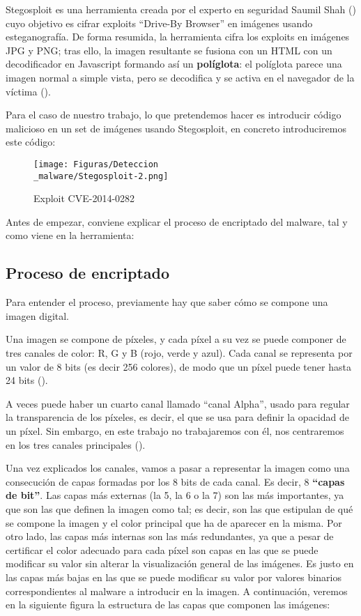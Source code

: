 Stegosploit es una herramienta creada por el experto en seguridad Saumil Shah (\cite{saumil-shah}) cuyo objetivo es cifrar exploits ``Drive-By Browser'' en imágenes usando esteganografía. De forma resumida, la herramienta cifra los exploits en imágenes JPG y PNG; tras ello, la imagen resultante se fusiona con un HTML con un decodificador en Javascript formando así un \textbf{políglota}: el políglota parece una imagen normal a simple vista, pero se decodifica y se activa en el navegador de la víctima (\cite{stegosploit}). %

Para el caso de nuestro trabajo, lo que pretendemos hacer es introducir código malicioso en un set de imágenes usando Stegosploit, en concreto introduciremos este código:

\begin{figure}[H]
  \centering
  \texttt{[image: Figuras/Deteccion\\\_malware/Stegosploit-2.png]}
  \label{fig:exploit}
  \caption{Exploit CVE-2014-0282}
\end{figure}

Antes de empezar, conviene explicar el proceso de encriptado del malware, tal y como viene en la herramienta:

\subsection{Proceso de encriptado}

Para entender el proceso, previamente hay que saber cómo se compone una imagen digital.

Una imagen se compone de píxeles, y cada píxel a su vez se puede componer de tres canales de color: R, G y B (rojo, verde y azul). Cada canal se representa por un valor de 8 bits (es decir 256 colores), de modo que un píxel puede tener hasta 24 bits (\cite{pixel}). %

A veces puede haber un cuarto canal llamado ``canal Alpha'', usado para regular la transparencia de los píxeles, es decir, el que se usa para definir la opacidad de un píxel. Sin embargo, en este trabajo no trabajaremos con él, nos centraremos en los tres canales principales (\cite{alpha-channel}). %

Una vez explicados los canales, vamos a pasar a representar la imagen como una consecución de capas formadas por los 8 bits de cada canal. Es decir, 8 \textbf{``capas de bit''}. Las capas más externas (la 5, la 6 o la 7) son las más importantes, ya que son las que definen la imagen como tal; es decir, son las que estipulan de qué se compone la imagen y el color principal que ha de aparecer en la misma. Por otro lado, las capas más internas son las más redundantes, ya que a pesar de certificar el color adecuado para cada píxel son capas en las que se puede modificar su valor sin alterar la visualización general de las imágenes. Es justo en las capas más bajas en las que se puede modificar su valor por valores binarios correspondientes al malware a introducir en la imagen. A continuación, veremos en la siguiente figura la estructura de las capas que componen las imágenes:

